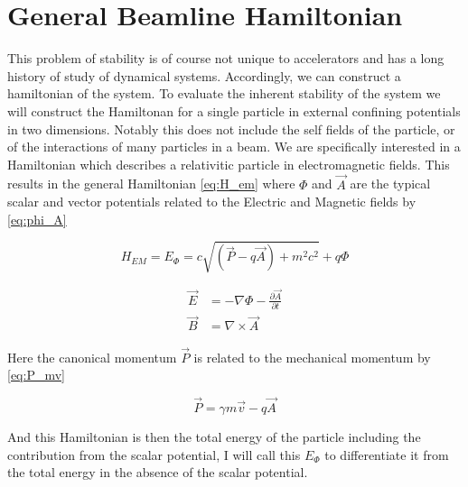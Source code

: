 \section{General Beamline Hamiltonian} \label{sec:genHam}

This problem of stability is of course not unique to accelerators and has a long history of study of dynamical systems. Accordingly, we can construct a hamiltonian of the system. To evaluate the inherent stability of the system we will construct the Hamiltonan for a single particle in external confining potentials in two dimensions. Notably this does not include the self fields of the particle, or of the interactions of many particles in a beam. We are specifically interested in a Hamiltonian which describes a relativitic particle in electromagnetic fields. This results in the general Hamiltonian \ref{eq:H_em} where $\Phi$ and $\vec{A}$ are the typical scalar and vector potentials related to the Electric and Magnetic fields by \ref{eq:phi_A}

\begin{equation} \label{eq:H_em}
H_{EM} = E_{\Phi} = c\sqrt{(\vec{P} - q\vec{A}) + m^2 c^2} + q\Phi
\end{equation}

\begin{equation} \label{eq:phi_A}
\begin{split} 
\vec{E} &= -\nabla \Phi - \frac{\partial \vec{A}}{\partial t}\\
\vec{B} &= \nabla \times \vec{A}
\end{split}
\end{equation}

Here the canonical momentum $\vec{P}$ is related to the mechanical momentum by \ref{eq:P_mv}

\begin{equation} \label{eq:P_mv}
	\vec{P} = \gamma m\vec{v} - q \vec{A}
\end{equation}

And this Hamiltonian is then the total energy of the particle including the contribution from the scalar potential, I will call this $E_{\Phi}$ to differentiate it from the total energy in the absence of the scalar potential.

